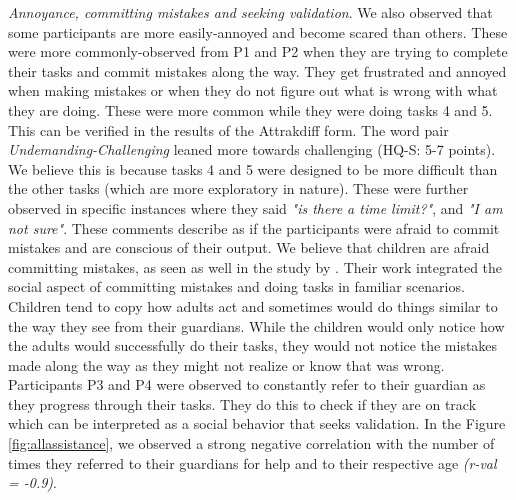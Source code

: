 \textit{Annoyance, committing mistakes and seeking validation}. We also observed that some participants are more easily-annoyed and become scared than others. These were more commonly-observed from P1 and P2 when they are trying to complete their tasks and commit mistakes along the way. They get frustrated and annoyed when making mistakes or when they do not figure out what is wrong with what they are doing.  These were more common while they were doing tasks 4 and 5. This can be verified in the results of the Attrakdiff form. The word pair \textit{Undemanding-Challenging} leaned more towards challenging (HQ-S: 5-7 points). We believe this is because tasks 4 and 5 were designed to be more difficult than the other tasks (which are more exploratory in nature). These were further observed in specific instances where they said \textit{"is there a time limit?"}, and \textit{"I am not sure"}. These comments describe as if the participants were afraid to commit mistakes and are conscious of their output. We believe that children are afraid committing mistakes, as seen as well in the study by \cite{hourcade2015child}. Their work integrated the social aspect of committing mistakes and doing tasks in familiar scenarios. Children tend to copy how adults act and sometimes would do things similar to the way they see from their guardians. While the children would only notice how the adults would successfully do their tasks, they would not notice the mistakes made along the way as they might not realize or know that was wrong. Participants P3 and P4 were observed to constantly refer to their guardian as they progress through their tasks. They do this to check if they are on track which can be interpreted as a social behavior that seeks validation. In the Figure \ref{fig:allassistance}, we observed a strong negative correlation with the number of times they referred to their guardians for help and to their respective age \textit{(r-val = -0.9)}. 


